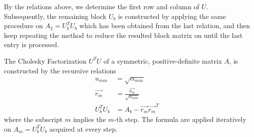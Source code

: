 By the relations above, we determine the first row and column of $U$. Subsequently, the remaining block $U_b$ is constructed by applying the same procedure on $A_2 = U_b^T U_b$ which has been obtained from the last relation, and then keep repeating the method to reduce the resulted block matrix on until the last entry is processed.
\begin{defn}
The Cholesky Factorization $U^TU$ of a symmetric, positive-definite matrix $A$, is constructed by the recursive relations
\begin{align*}
u_{mm} &= \sqrt{\alpha_{mm}} \\
\vec{r_m} &= \frac{\vec{a_m}}{\sqrt{\alpha_{mm}}} \\
U_b^T U_b &= A_b - \vec{r_m}\vec{r_m}^T
\end{align*}
where the subscript $m$ implies the $m$-th step. The formula are applied iteratively on $A_m = U_b^T U_b$ acquired at every step.
\end{defn}


